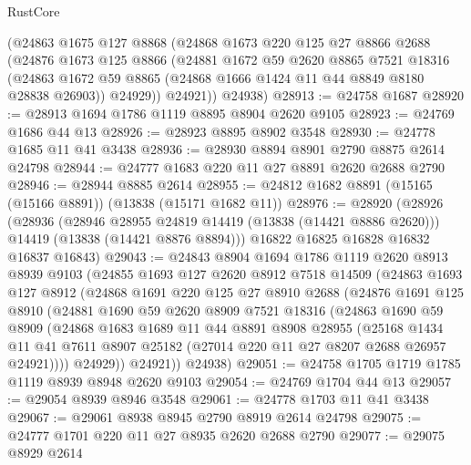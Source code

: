 \begin{lexlean}{RustCore}
\begin{coremodule}
      (@24863
        @1675
        @127
        @8868
        (@24868
          @1673
          @220
          @125
          @27
          @8866
          @2688
          (@24876
            @1673
            @125
            @8866
            (@24881
              @1672
              @59
              @2620
              @8865
              @7521
              @18316
              (@24863 @1672 @59 @8865 (@24868 @1666 @1424 @11 @44 @8849 @8180 @28838 @26903))
              @24929))
          @24921))
      @24938)
@28913 := @24758 @1687
@28920 := @28913 @1694 @1786 @1119 @8895 @8904 @2620 @9105
@28923 := @24769 @1686 @44 @13
@28926 := @28923 @8895 @8902 @3548
@28930 := @24778 @1685 @11 @41 @3438
@28936 := @28930 @8894 @8901 @2790 @8875 @2614 @24798
@28944 := @24777 @1683 @220 @11 @27 @8891 @2620 @2688 @2790
@28946 := @28944 @8885 @2614
@28955 := @24812 @1682 @8891 (@15165 (@15166 @8891)) (@13838 (@15171 @1682 @11))
@28976 := @28920
    (@28926
      (@28936
        (@28946 @28955 @24819 @14419 (@13838 (@14421 @8886 @2620)))
        @14419
        (@13838 (@14421 @8876 @8894)))
      @16822
      @16825
      @16828
      @16832
      @16837
      @16843)
@29043 := @24843
    @8904
    @1694
    @1786
    @1119
    @2620
    @8913
    @8939
    @9103
    (@24855
      @1693
      @127
      @2620
      @8912
      @7518
      @14509
      (@24863
        @1693
        @127
        @8912
        (@24868
          @1691
          @220
          @125
          @27
          @8910
          @2688
          (@24876
            @1691
            @125
            @8910
            (@24881
              @1690
              @59
              @2620
              @8909
              @7521
              @18316
              (@24863
                @1690
                @59
                @8909
                (@24868
                  @1683
                  @1689
                  @11
                  @44
                  @8891
                  @8908
                  @28955
                  (@25168
                    @1434
                    @11
                    @41
                    @7611
                    @8907
                    @25182
                    (@27014 @220 @11 @27 @8207 @2688 @26957 @24921))))
              @24929))
          @24921))
      @24938)
@29051 := @24758 @1705 @1719 @1785 @1119 @8939 @8948 @2620 @9103
@29054 := @24769 @1704 @44 @13
@29057 := @29054 @8939 @8946 @3548
@29061 := @24778 @1703 @11 @41 @3438
@29067 := @29061 @8938 @8945 @2790 @8919 @2614 @24798
@29075 := @24777 @1701 @220 @11 @27 @8935 @2620 @2688 @2790
@29077 := @29075 @8929 @2614

\end{coremodule}
\end{lexlean}
